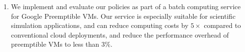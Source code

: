 \begin{enumerate} [leftmargin=12pt]
\item We implement and evaluate our policies as part of a batch computing service for Google Preemptible VMs. Our service is especially suitable for scientific simulation applications, and can reduce computing costs by $5\times$ compared to conventional cloud deployments, and reduce the performance overhead of preemptible VMs to less than $3\%$. 

 
\end{enumerate}







